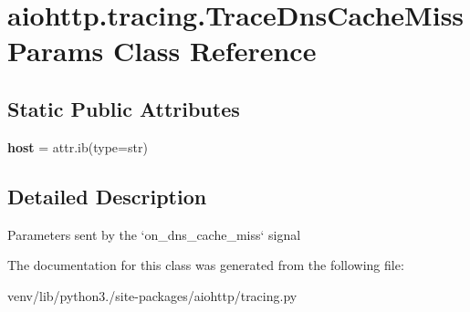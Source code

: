 \hypertarget{classaiohttp_1_1tracing_1_1_trace_dns_cache_miss_params}{}\section{aiohttp.\+tracing.\+Trace\+Dns\+Cache\+Miss\+Params Class Reference}
\label{classaiohttp_1_1tracing_1_1_trace_dns_cache_miss_params}
\subsection*{Static Public Attributes}
\begin{DoxyCompactItemize}
\item 
\mbox{\label{classaiohttp_1_1tracing_1_1_trace_dns_cache_miss_params_a03a5eef3b4c4155248e11758e3ac582b}} 
{\bfseries host} = attr.\+ib(type=str)
\end{DoxyCompactItemize}


\subsection{Detailed Description}
\begin{DoxyVerb}Parameters sent by the `on_dns_cache_miss` signal\end{DoxyVerb}
 

The documentation for this class was generated from the following file\+:\begin{DoxyCompactItemize}
\item 
venv/lib/python3./site-\/packages/aiohttp/tracing.\+py\end{DoxyCompactItemize}
